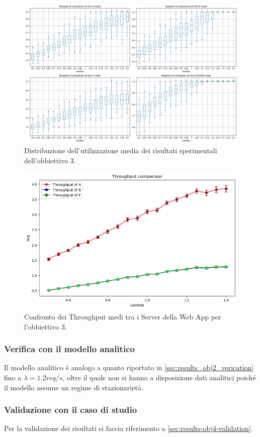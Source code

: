 \begin{figure}
    \centering
    \includegraphics[width=1\linewidth]{figs//results//obj3//simulation/obj3_boxplot_utilization.png}
    \caption{Distribuzione dell'utilizzazione media dei risultati sperimentali dell'obbiettivo 3.}
    \label{fig:obj3_boxplot_utilization}
\end{figure}

\begin{figure}[H]
    \centering
    \includegraphics[width=1\linewidth]{figs//results//obj3//simulation/obj3_lineplot_throughput_comparison.png}
    \caption{Confronto dei Throughput medi tra i Server della Web App per l'obbiettivo 3. }
    \label{fig:obj3_lineplot_throughput_comparison}
\end{figure}

\subsubsection{Verifica con il modello analitico}

Il modello analitico è analogo a quanto riportato in \autoref{sec:results_obj2_verication} fino a $\lambda = 1.2 req/s$, oltre il quale non si hanno a disposizione dati analitici poiché il modello assume un regime di stazionarietà.

% 

\subsubsection{Validazione con il caso di studio}
Per la validazione dei risultati si faccia riferimento a \autoref{sec:results-obj4-validation}.
